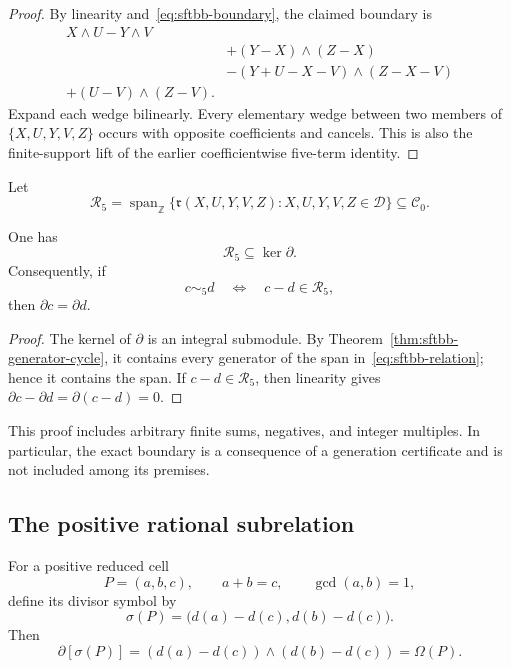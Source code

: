 \begin{proof}
By linearity and~\eqref{eq:sftbb-boundary}, the claimed boundary is
\begin{align*}
 X\wedge U-Y\wedge V\\
 &+(Y-X)\wedge(Z-X)\\
 &-(Y+U-X-V)\wedge(Z-X-V)\\
 +(U-V)\wedge(Z-V).
\end{align*}
Expand each wedge bilinearly.  Every elementary wedge between two members of
$\{X,U,Y,V,Z\}$ occurs with opposite coefficients and cancels.  This is
also the finite-support lift of the earlier coefficientwise five-term
identity.
\end{proof}

Let
\begin{equation}
 \mathcal R_5=\operatorname{span}_{\mathbb Z}
 \{\mathfrak r(X,U,Y,V,Z):X,U,Y,V,Z\in\mathcal D\}
 \subseteq\mathcal C_0.
 \label{eq:sftbb-relation}
\end{equation}

\begin{theorem}
\label{thm:sftbb-span-kernel}
One has
\[
 \mathcal R_5\subseteq\ker\partial.
\]
Consequently, if
\[
 c\sim_5 d
 \quad\Longleftrightarrow\quad c-d\in\mathcal R_5,
\]
then $\partial c=\partial d$.
\end{theorem}

\begin{proof}
The kernel of $\partial$ is an integral submodule.  By
Theorem~\ref{thm:sftbb-generator-cycle}, it contains every generator of the
span in~\eqref{eq:sftbb-relation}; hence it contains the span.  If
$c-d\in\mathcal R_5$, then linearity gives
$\partial c-\partial d=\partial(c-d)=0$.
\end{proof}

This proof includes arbitrary finite sums, negatives, and integer
multiples.  In particular, the exact boundary is a consequence of a
generation certificate and is not included among its premises.

\subsection{The positive rational subrelation}

For a positive reduced cell
\[
 P=(a,b,c),\qquad a+b=c,\qquad\gcd(a,b)=1,
\]
define its divisor symbol by
\begin{equation}
 \sigma(P)=\bigl(d(a)-d(c),d(b)-d(c)\bigr).
 \label{eq:sftbb-cell-symbol}
\end{equation}
Then
\begin{equation}
 \partial[\sigma(P)]
 =(d(a)-d(c))\wedge(d(b)-d(c))=\Omega(P).
 \label{eq:sftbb-cell-boundary}
\end{equation}

